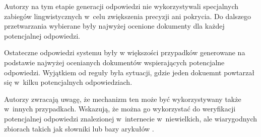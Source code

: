 Autorzy \cite{brill2001data} na tym etapie generacji odpowiedzi nie wykorzystywali specjalnych zabiegów lingwistycznych w~celu zwiększenia precyzji ani pokrycia. Do dalszego przetwarzania wybierane były najwyżej ocenione dokumenty dla każdej potencjalnej odpowiedzi.

Ostateczne odpowiedzi systemu były w większości przypadków generowane na podstawie najwyżej ocenianych dokumentów wspierających potencjalne odpowiedzi. Wyjątkiem od reguły była sytuacji, gdzie jeden dokuemnt powtarzał się w~kilku potencjalnych odpowiedziach.

Autorzy \cite{brill2001data} zwracają uwagę, że mechanizm ten może być wykorzystywany także w~innych przypadkach. Wskazują, że można go wykorzystać do weryfikacji potencjalnej odpowiedzi znalezionej w~internecie w~niewielkich, ale wiarygodnych zbiorach takich jak słowniki lub bazy arykułów \cite{brill2001data}.
